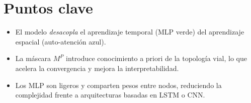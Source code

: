 \documentclass[11pt,a4paper]{article}
\begin{document}
	\section*{Puntos clave}
	
	\begin{itemize}
		\item El modelo \emph{desacopla} el aprendizaje temporal (MLP verde)
		del aprendizaje espacial (auto-atención azul).
		\item La máscara $M^{P}$ introduce conocimiento a priori de la topología vial,
		lo que acelera la convergencia y mejora la interpretabilidad.
		\item Los MLP son ligeros y comparten pesos entre nodos, reduciendo la
		complejidad frente a arquitecturas basadas en LSTM o CNN.
	\end{itemize}
	
\end{document}
